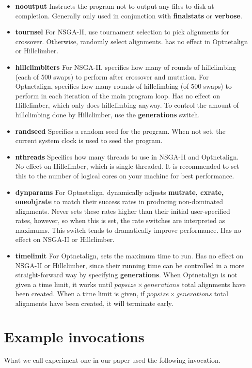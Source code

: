 \documentclass[11pt]{article} %
\begin{document}
\begin{itemize}
\item \textbf{nooutput} Instructs the program not to output any files to disk at completion. Generally only used in conjunction with \textbf{finalstats} or \textbf{verbose}.
\item \textbf{tournsel} For NSGA-II, use tournament selection to pick alignments for crossover. Otherwise, randomly select alignments. has no effect in Optnetalign or Hillclimber.
\item \textbf{hillclimbiters} For NSGA-II, specifies how many of rounds of hillclimbing (each of 500 swaps) to perform after crossover and mutation. For Optnetalign, specifies how many rounds of hillclimbing (of 500 swaps) to perform in each iteration of the main program loop. Has no effect on Hillclimber, which only does hillclimbing anyway. To control the amount of hillclimbing done by Hillclimber, use the \textbf{generations} switch.
\item \textbf{randseed} Specifies a random seed for the program. When not set, the current system clock is used to seed the program.
\item \textbf{nthreads} Specifies how many threads to use in NSGA-II and Optnetalign. No effect on Hillclimber, which is single-threaded. It is recommended to set this to the number of logical cores on your machine for best performance.
\item \textbf{dynparams} For Optnetalign, dynamically adjusts \textbf{mutrate, cxrate, oneobjrate} to match their success rates in producing non-dominated alignments. Never sets these rates higher than their initial user-specified rates, however, so when this is set, the rate switches are interpreted as maximums. This switch tends to dramatically improve performance. Has no effect on NSGA-II or Hillclimber.
\item \textbf{timelimit} For Optnetalign, sets the maximum time to run. Has no effect on NSGA-II or Hillclimber, since their running time can be controlled in a more straight-forward way by specifying \textbf{generations}. When Optnetalign is not given a time limit, it works until \(popsize \times generations\) total alignments have been created. When a time limit is given, if \(popsize \times generations\) total alignments have been created, it will terminate early.
\end{itemize}

\section{Example invocations}
What we call experiment one in our paper used the following invocation.
\end{document}
